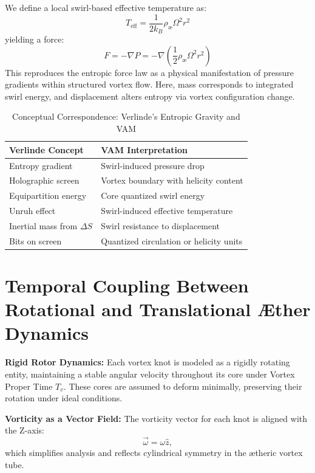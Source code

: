 \documentclass[a4paper,12pt]{article}
\begin{document}
    We define a local swirl-based effective temperature as:
    \[
        T_\text{eff} = \frac{1}{2k_B} \rho_{\text{\ae}} \Omega^2 r^2
    \]
    yielding a force:
    \[
        F = -\nabla P = -\nabla \left( \frac{1}{2} \rho_{\text{\ae}} \Omega^2 r^2 \right)
    \]
    This reproduces the entropic force law as a physical manifestation of pressure gradients within structured vortex flow. Here, mass corresponds to integrated swirl energy, and displacement alters entropy via vortex configuration change.

    \begin{table}[H]
        \centering
        \caption{Conceptual Correspondence: Verlinde's Entropic Gravity and VAM}
        \footnotesize
        \begin{tabular}{|l|l|}
            \hline
            \textbf{Verlinde Concept} & \textbf{VAM Interpretation} \\
            \hline
            Entropy gradient & Swirl-induced pressure drop \\
            Holographic screen & Vortex boundary with helicity content \\
            Equipartition energy & Core quantized swirl energy \\
            Unruh effect & Swirl-induced effective temperature \\
            Inertial mass from $\Delta S$ & Swirl resistance to displacement \\
            Bits on screen & Quantized circulation or helicity units \\
            \hline
        \end{tabular}
    \end{table}



    \section{Temporal Coupling Between Rotational and Translational Æther Dynamics}

    \textbf{Rigid Rotor Dynamics:} Each vortex knot is modeled as a rigidly rotating entity, maintaining a stable angular velocity throughout its core under Vortex Proper Time \( T_v \). These cores are assumed to deform minimally, preserving their rotation under ideal conditions.

    \textbf{Vorticity as a Vector Field:} The vorticity vector for each knot is aligned with the Z-axis:
    \begin{equation*}
        \vec{\omega} = \omega \hat{z},
    \end{equation*}
    which simplifies analysis and reflects cylindrical symmetry in the ætheric vortex tube.
\end{document}
